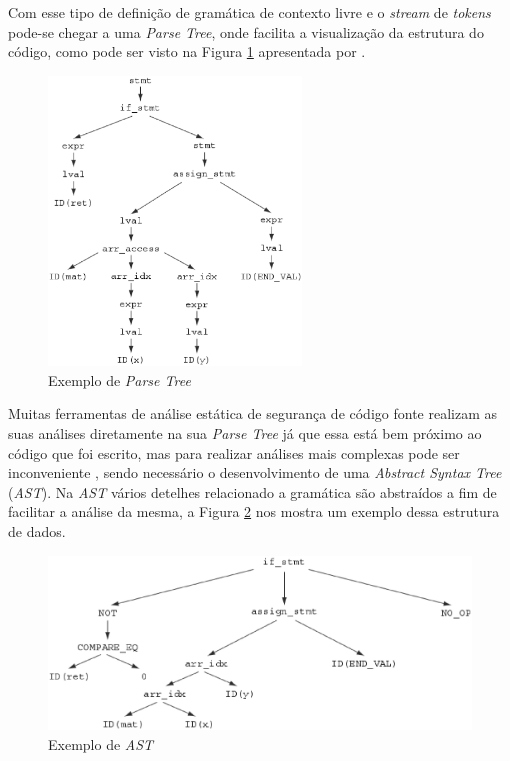 Com esse tipo de definição de gramática de contexto livre e o \textit{stream}
de \textit{tokens} pode-se chegar a uma \textit{Parse Tree}, onde facilita a
visualização da estrutura do código, como pode ser visto na Figura
\ref{fig:parse_tree} apresentada por .

\begin{figure}[h]
  \centering
  \includegraphics[width=0.6\textwidth]
      {figuras/parse_tree}
      \caption{Exemplo de \textit{Parse Tree} \cite{chess&west2007}}
  \label{fig:parse_tree}
\end{figure}

Muitas ferramentas de análise estática de segurança de código fonte realizam as
suas análises diretamente na sua \textit{Parse Tree} já que essa está bem
próximo ao código que foi escrito, mas para realizar análises mais complexas
pode ser inconveniente \cite{chess&west2007}, sendo necessário o desenvolvimento
de uma \textit{Abstract Syntax Tree} (\textit{AST}). Na \textit{AST} vários
detelhes relacionado a gramática são abstraídos a fim de facilitar a análise da
mesma, a Figura \ref{fig:ast} nos mostra um exemplo dessa estrutura de dados.

\begin{figure}[h]
  \centering
  \includegraphics[width=1.0\textwidth]
      {figuras/ast}
      \caption{Exemplo de \textit{AST} \cite{chess&west2007}}
  \label{fig:ast}
\end{figure}

